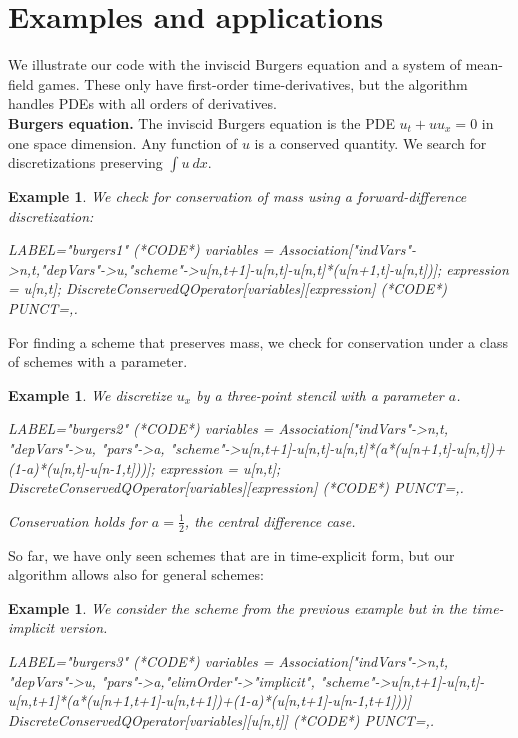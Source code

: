 \documentclass[manuscript]{acmart}
\newcommand{\1}{{\chi}}
\numberwithin{equation}{section}
\theoremstyle{thmlemcorr}
\numberwithin{theorem}{section}
\theoremstyle{thmlemcorr*}
\theoremstyle{defi}
\theoremstyle{remexample}
\newtheorem{example}[theorem]{Example}
\theoremstyle{ass}
\begin{document}
\section{Examples and applications}
\label{eaa}
We illustrate our code with the inviscid Burgers equation and a system of mean-field games. These only have first-order time-derivatives, but the algorithm handles PDEs with all orders of derivatives.\\
{\bf Burgers equation.}
The inviscid Burgers equation is the PDE $u_t+uu_x=0$ \cite{smoller94} in one space dimension. Any function of $u$ is a conserved quantity. We search for discretizations preserving $\int u\ dx$.
\begin{example}
	We check for conservation of mass using a forward-difference discretization:
	\begin{EXE}
		LABEL="burgers1"
		(*CODE*)
		variables = Association["indVars"->{n,t},"depVars"->{u},"scheme"->{u[n,t+1]-u[n,t]-u[n,t]*(u[n+1,t]-u[n,t])}];
		expression = u[n,t];
		DiscreteConservedQOperator[variables][expression]
		(*CODE*)
		PUNCT={,.}
	\end{EXE}
	\begin{small}
		
		
	\end{small}
\end{example}
For finding a scheme that preserves mass, we check for conservation under a class of schemes with a parameter.
\begin{example}
	We discretize $u_x$ by a three-point stencil with a parameter $a$.
	\begin{EXE}
		LABEL="burgers2"
		(*CODE*)
		variables = Association["indVars"->{n,t}, "depVars"->{u}, "pars"->{a}, "scheme"->{u[n,t+1]-u[n,t]-u[n,t]*(a*(u[n+1,t]-u[n,t])+(1-a)*(u[n,t]-u[n-1,t]))}];
		expression = u[n,t];
		DiscreteConservedQOperator[variables][expression]
		(*CODE*)
		PUNCT={,.}
	\end{EXE}
	\begin{small}
		
		
	\end{small}
	Conservation holds for $a=\frac{1}{2}$, the central difference case.
\end{example}
So far, we have only seen schemes that are in time-explicit form, but our algorithm allows also for general schemes:
\begin{example}
	We consider the scheme from the previous example but in the time-implicit version.
	\begin{EXE}
		LABEL="burgers3"
		(*CODE*)
		variables = Association["indVars"->{n,t}, "depVars"->{u}, "pars"->{a},"elimOrder"->"implicit", "scheme"->{u[n,t+1]-u[n,t]-u[n,t+1]*(a*(u[n+1,t+1]-u[n,t+1])+(1-a)*(u[n,t+1]-u[n-1,t+1]))}]
		DiscreteConservedQOperator[variables][u[n,t]]
		(*CODE*)
		PUNCT={,.}
	\end{EXE}
	\begin{small}
		
		
	\end{small}
\end{example}
\end{document}
